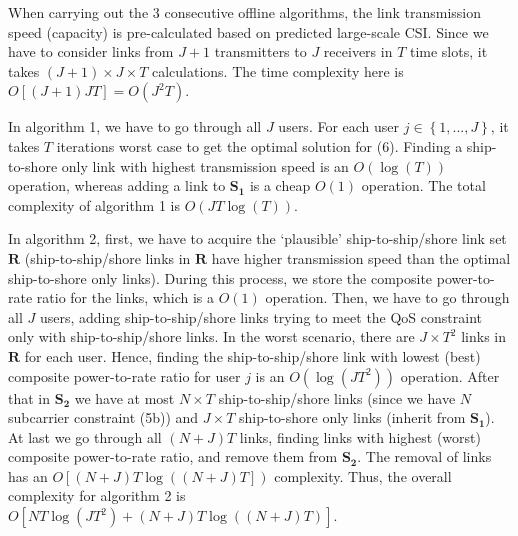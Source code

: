 \documentclass[conference]{IEEEtran}
\begin{document}
 When carrying out the 3 consecutive offline algorithms, the link transmission speed (capacity) is pre-calculated based on predicted large-scale CSI. Since we have to consider links from $J+1$ transmitters to $J$ receivers in $T$ time slots, it takes $\left( {J + 1} \right) \times J \times T$ calculations. The time complexity here is $O\left[ {\left( {J + 1} \right)JT} \right] = O\left( {{J^2}T} \right)$.

 In algorithm 1, we have to go through all $J$ users. For each user $j \in \left\{ {1,...,J} \right\}$, it takes $T$ iterations worst case to get the optimal solution for (6). Finding a ship-to-shore only link with highest transmission speed is an $O\left( \log \left( T \right) \right)$ operation, whereas adding a link to ${{\mathbf{S}}_{\mathbf{1}}}$ is a cheap $O\left( 1 \right)$ operation. The total complexity of algorithm 1 is $O\left( J T\log \left( T \right) \right)$.

 In algorithm 2, first, we have to acquire the `plausible' ship-to-ship/shore link set ${\mathbf{R}}$ (ship-to-ship/shore links in ${\mathbf{R}}$ have higher transmission speed than the optimal ship-to-shore only links). During this process, we store the composite power-to-rate ratio for the links, which is a $O\left( 1 \right)$ operation. 
 Then, we have to go through all $J$ users, adding ship-to-ship/shore links trying to meet the QoS constraint only with ship-to-ship/shore links. In the worst scenario, there are $J \times T^2$ links in ${\mathbf{R}}$ for each user. Hence, finding the ship-to-ship/shore link with lowest (best) composite power-to-rate ratio for user $j$ is an $O\left( \log \left( JT^2 \right) \right)$ operation. 
 After that in ${{\mathbf{S}}_{\mathbf{2}}}$ we have at most $N \times T$ ship-to-ship/shore links (since we have $N$ subcarrier constraint (5b)) and $J \times T$ ship-to-shore only links (inherit from ${{\mathbf{S}}_{\mathbf{1}}}$). 
 At last we go through all $\left( {N + J} \right)T$ links, finding links with highest (worst) composite power-to-rate ratio, and remove them from ${{\mathbf{S}}_{\mathbf{2}}}$. The removal of links has an $O\left[ \left( {N + J} \right)T \log \left( {\left( {N + J} \right)T} \right] \right)$ complexity. 
 Thus, the overall complexity for algorithm 2 is $O\left[ NT \log \left( JT^2 \right) + \left( {N + J} \right)T \log \left( {\left( {N + J} \right)T} \right) \right]$.
\end{document}
